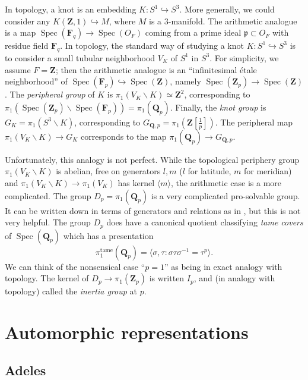 \documentclass[oneside]{amsart}
\DeclareMathOperator{\spectrum}{Spec}
\newcommand{\dF}{\mathbf{F}}
\newcommand{\dQ}{\mathbf{Q}}
\newcommand{\dZ}{\mathbf{Z}}
\newcommand{\fp}{\mathfrak{p}}
\begin{document}
In topology, a knot is an embedding $K:S^1\hookrightarrow S^3$. More generally, 
we could consider any $K(\dZ,1)\hookrightarrow M$, where $M$ is a $3$-manifold. 
The arithmetic analogue is a map $\spectrum(\dF_q) \to \spectrum(O_F)$ coming 
from a prime ideal $\fp\subset O_F$ with residue field $\dF_q$. In topology, 
the standard way of studying a knot $K:S^1\hookrightarrow S^3$ is to consider 
a small tubular neighborhood $V_K$ of $S^1$ in $S^3$. For simplicity, 
we assume $F=\dZ$; then the arithmetic analogue is an ``infinitesimal \'etale 
neighborhood'' of $\spectrum(\dF_p)\hookrightarrow \spectrum(\dZ)$, namely 
$\spectrum(\dZ_p)\to \spectrum(\dZ)$. The \emph{peripheral group} of $K$ is 
$\pi_1(V_K\smallsetminus K)\simeq \dZ^2$, corresponding to 
$\pi_1(\spectrum(\dZ_p)\smallsetminus \spectrum(\dF_p))=\pi_1(\dQ_p)$. Finally, 
the \emph{knot group} is $G_K=\pi_1(S^3\smallsetminus K)$, corresponding to 
$G_{\dQ,p} = \pi_1(\dZ[\frac 1 p])$. The peripheral map 
$\pi_1(V_K\smallsetminus K) \to G_K$ corresponds to the map 
$\pi_1(\dQ_p) \to G_{\dQ,p}$. 

Unfortunately, this analogy is not perfect. While the topological periphery 
group $\pi_1(V_K\smallsetminus K)$ is abelian, free on generators $l,m$ 
($l$ for latitude, $m$ for meridian) and 
$\pi_1(V_K\smallsetminus K) \to \pi_1(V_K)$ has kernel $\langle m\rangle$, the 
arithmetic case is a more complicated. The group $D_p=\pi_1(\dQ_p)$ is a very 
complicated pro-solvable group. It can be written down in terms of generators 
and relations as in \cite[VII \S 5]{nsw08}, but this is not very helpful. The 
group $D_p$ does have a canonical quotient classifying \emph{tame covers} of 
$\spectrum(\dQ_p)$ which has a presentation 
\[
  \pi_1^\mathrm{tame}(\dQ_p) = \langle \sigma,\tau : \sigma \tau \sigma^{-1} = \tau^p\rangle .
\]
We can think of the nonsensical case ``$p=1$'' as being in exact analogy with 
topology. The kernel of $D_p\to\pi_1(\dZ_p)$ is written $I_p$, and (in analogy 
with topology) called the \emph{inertia group} at $p$. 






\section{Automorphic representations}


\subsection{Adeles}
\end{document}
